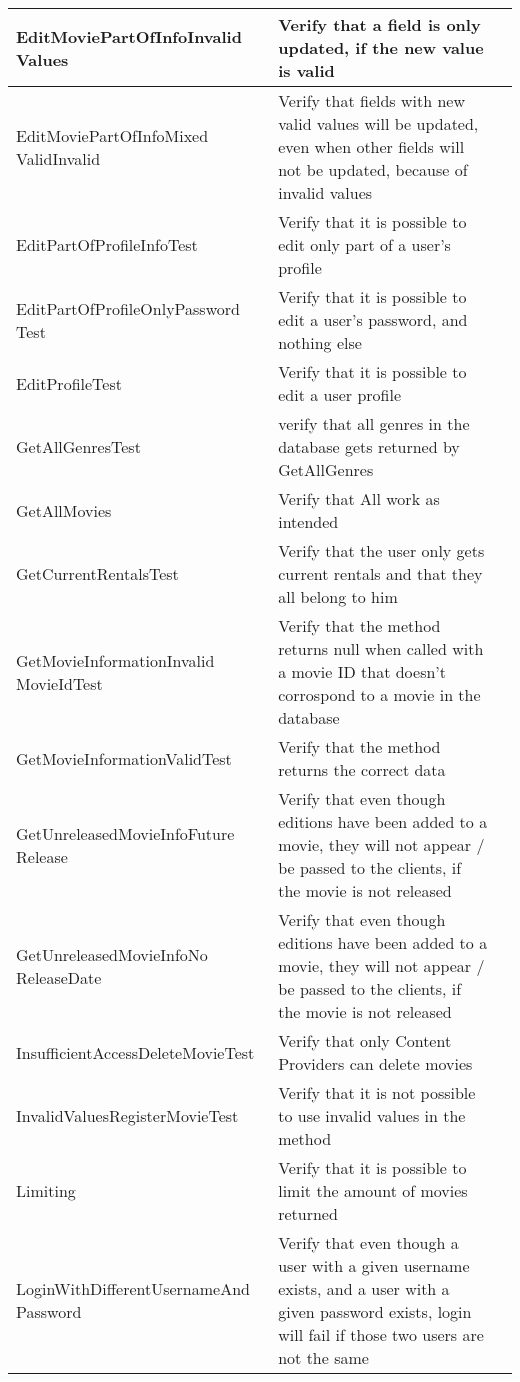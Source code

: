 \begin{centering}
\begin{longtable}{| p{5 cm} | p{9 cm} | c |}
\hline
EditMoviePartOfInfoInvalid Values & Verify that a field is only updated, if the new value is valid & \\
\hline
EditMoviePartOfInfoMixed ValidInvalid & Verify that fields with new valid values will be updated, even when other fields will not be updated, because of invalid values & \\
\hline
EditPartOfProfileInfoTest & Verify that it is possible to edit only part of a user's profile & \\
\hline
EditPartOfProfileOnlyPassword Test & Verify that it is possible to edit a user's password, and nothing else & \\
\hline
EditProfileTest & Verify that it is possible to edit a user profile & \\
\hline
GetAllGenresTest & verify that all genres in the database gets returned by GetAllGenres & \\
\hline
GetAllMovies & Verify that All work as intended & \\
\hline
GetCurrentRentalsTest & Verify that the user only gets current rentals and that they all belong to him & \\
\hline
GetMovieInformationInvalid MovieIdTest & Verify that the method returns null when called with a movie ID that doesn't corrospond to a movie in the database & \\
\hline
GetMovieInformationValidTest & Verify that the method returns the correct data & \\
\hline
GetUnreleasedMovieInfoFuture Release & Verify that even though editions have been added to a movie, they will not appear / be passed to the clients, if the movie is not released & \\
\hline
GetUnreleasedMovieInfoNo ReleaseDate & Verify that even though editions have been added to a movie, they will not appear / be passed to the clients, if the movie is not released & \\
\hline
InsufficientAccessDeleteMovieTest & Verify that only Content Providers can delete movies & \\
\hline
InvalidValuesRegisterMovieTest & Verify that it is not possible to use invalid values in the method & \\
\hline
Limiting & Verify that it is possible to limit the amount of movies returned & \\
\hline
LoginWithDifferentUsernameAnd Password & Verify that even though a user with a given username exists, and a user with a given password exists, login will fail if those two users are not the same & \\

\end{longtable}
\end{centering}
